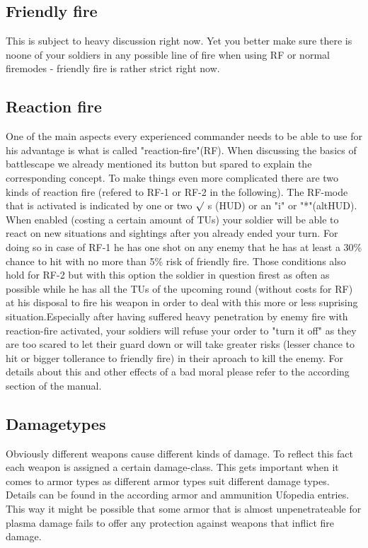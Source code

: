\subsection{Friendly fire}
This is subject to heavy discussion right now. Yet you better make sure there is noone of your soldiers in any possible line of fire when using RF or normal firemodes - friendly fire is rather strict right now.

\subsection{Reaction fire}
One of the main aspects every experienced commander needs to be able to use for his advantage is what is called "reaction-fire"(RF). When discussing the basics of battlescape we already mentioned its button but spared to explain the corresponding concept. To make things even more complicated there are two kinds of reaction fire (refered to RF-1 or RF-2 in the following). The RF-mode that is activated is indicated by one or two $\surd$ s (HUD) or an "i" or "*"(altHUD). When enabled (costing a certain amount of TUs) your soldier will be able to react on new situations and sightings after you already ended your turn. For doing so in case of RF-1 he has one shot on any enemy that he has at least a 30\% chance to hit with no more than 5\% risk of friendly fire. Those conditions also hold for RF-2 but with this option the soldier in question firest as often as possible while he has all the TUs of the upcoming round (without costs for RF) at his disposal to fire his weapon in order to deal with this more or less suprising situation.Especially after having suffered heavy penetration by enemy fire with reaction-fire activated, your soldiers will refuse your order to "turn it off" as they are too scared to let their guard down or will take greater risks (lesser chance to hit or bigger tollerance to friendly fire) in their aproach to kill the enemy. For details about this and other effects of a bad moral please refer to the according section of the manual.

\subsection{Damagetypes}
Obviously different weapons cause different kinds of damage. To reflect this fact each weapon is assigned a certain damage-class. This gets important when it comes to armor types as different armor types suit different damage types. Details can be found in the according armor and ammunition Ufopedia entries. This way it might be possible that some armor that is almost unpenetrateable for plasma damage fails to offer any protection against weapons that inflict fire damage.

